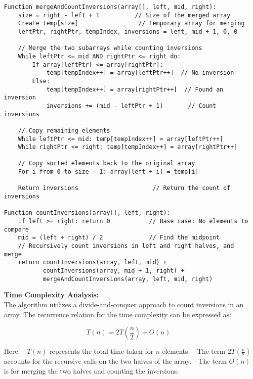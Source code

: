 \documentclass[a4paper,12pt]{report}
\begin{document}
\begin{tcolorbox}[colback=white, colframe=black, boxrule=0.5pt]
\ttfamily\small
\begin{verbatim}
Function mergeAndCountInversions(array[], left, mid, right):
    size = right - left + 1          // Size of the merged array
    Create temp[size]                 // Temporary array for merging
    leftPtr, rightPtr, tempIndex, inversions = left, mid + 1, 0, 0
    
    // Merge the two subarrays while counting inversions
    While leftPtr <= mid AND rightPtr <= right do:
        If array[leftPtr] <= array[rightPtr]:
            temp[tempIndex++] = array[leftPtr++]  // No inversion
        Else:
            temp[tempIndex++] = array[rightPtr++]  // Found an inversion
            inversions += (mid - leftPtr + 1)       // Count inversions
    
    // Copy remaining elements
    While leftPtr <= mid: temp[tempIndex++] = array[leftPtr++]
    While rightPtr <= right: temp[tempIndex++] = array[rightPtr++]
    
    // Copy sorted elements back to the original array
    For i from 0 to size - 1: array[left + i] = temp[i]
    
    Return inversions                     // Return the count of inversions

Function countInversions(array[], left, right):
    if left >= right: return 0           // Base case: No elements to compare
    mid = (left + right) / 2             // Find the midpoint
    // Recursively count inversions in left and right halves, and merge
    return countInversions(array, left, mid) +
           countInversions(array, mid + 1, right) +
           mergeAndCountInversions(array, left, mid, right)
\end{verbatim}
\end{tcolorbox}

\large \textbf{Time Complexity Analysis:} \hfill \\

The algorithm utilizes a divide-and-conquer approach to count inversions in an array. The recurrence relation for the time complexity can be expressed as:

\[
T(n) = 2T\left(\frac{n}{2}\right) + O(n)
\]

Here:
- \(T(n)\) represents the total time taken for \(n\) elements.
- The term \(2T\left(\frac{n}{2}\right)\) accounts for the recursive calls on the two halves of the array.
- The term \(O(n)\) is for merging the two halves and counting the inversions.
\end{document}
